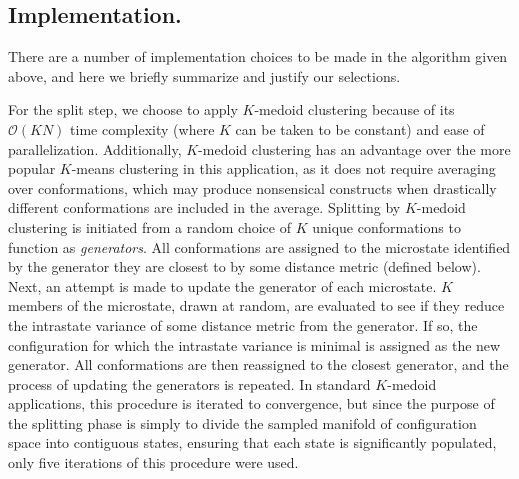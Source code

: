\subsection{Implementation.}
\label{automatic:section:methods:implementation}

There are a number of implementation choices to be made in the algorithm given above, and here we briefly summarize and justify our selections.

For the split step, we choose to apply $K$-medoid clustering \cite{hastie:2001a} because of its $\mathcal{O}(KN)$ time complexity (where $K$ can be taken to be constant) and ease of parallelization.
Additionally, $K$-medoid clustering has an advantage over the more popular $K$-means clustering \cite{macqueen:1967} in this application, as it does not require averaging over conformations, which may produce nonsensical constructs when drastically different conformations are included in the average.
Splitting by $K$-medoid clustering is initiated from a random choice of $K$ unique conformations to function as \emph{generators}.
All conformations are assigned to the microstate identified by the generator they are closest to by some distance metric (defined below).
Next, an attempt is made to update the generator of each microstate.
$K$ members of the microstate, drawn at random, are evaluated to see if they reduce the intrastate variance of some distance metric from the generator.
If so, the configuration for which the intrastate variance is minimal is assigned as the new generator.
All conformations are then reassigned to the closest generator, and the process of updating the generators is repeated.
In standard $K$-medoid applications, this procedure is iterated to convergence, but since the purpose of the splitting phase is simply to divide the sampled manifold of configuration space into contiguous states, ensuring that each state is significantly populated, only five iterations of this procedure were used.

